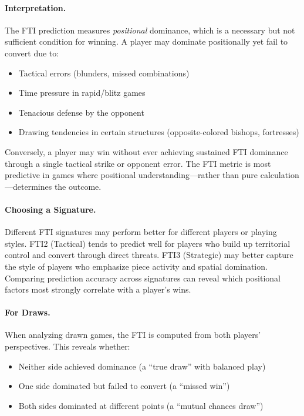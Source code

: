 \documentclass[11pt]{book}
\begin{document}
\paragraph{Interpretation.} The FTI prediction measures \emph{positional} dominance, which is a necessary but not sufficient condition for winning. A player may dominate positionally yet fail to convert due to:
\begin{itemize}
\item Tactical errors (blunders, missed combinations)
\item Time pressure in rapid/blitz games
\item Tenacious defense by the opponent
\item Drawing tendencies in certain structures (opposite-colored bishops, fortresses)
\end{itemize}

Conversely, a player may win without ever achieving sustained FTI dominance through a single tactical strike or opponent error. The FTI metric is most predictive in games where positional understanding---rather than pure calculation---determines the outcome.

\paragraph{Choosing a Signature.} Different FTI signatures may perform better for different players or playing styles. FTI2 (Tactical) tends to predict well for players who build up territorial control and convert through direct threats. FTI3 (Strategic) may better capture the style of players who emphasize piece activity and spatial domination. Comparing prediction accuracy across signatures can reveal which positional factors most strongly correlate with a player's wins.

\paragraph{For Draws.} When analyzing drawn games, the FTI is computed from both players' perspectives. This reveals whether:
\begin{itemize}
\item Neither side achieved dominance (a ``true draw'' with balanced play)
\item One side dominated but failed to convert (a ``missed win'')
\item Both sides dominated at different points (a ``mutual chances draw'')
\end{itemize}
\end{document}
